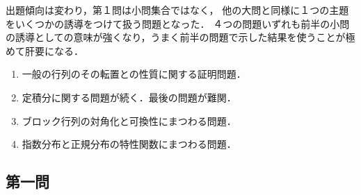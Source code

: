 \documentclass[uplatex,dvipdfmx]{jsarticle}
\begin{document}
\begin{tcolorbox}[colframe=ForestGreen, colback=ForestGreen!10!white,breakable,colbacktitle=ForestGreen!40!white,coltitle=black,fonttitle=\bfseries\sffamily,
    title=概観]
    出題傾向は変わり，第１問は小問集合ではなく，
    他の大問と同様に１つの主題をいくつかの誘導をつけて扱う問題となった．
    ４つの問題いずれも前半の小問の誘導としての意味が強くなり，うまく前半の問題で示した結果を使うことが極めて肝要になる．
    \begin{enumerate}[{第}1{問}]
        \item 一般の行列のその転置との性質に関する証明問題．
        \item 定積分に関する問題が続く．最後の問題が難関．
        \item ブロック行列の対角化と可換性にまつわる問題．
        \item 指数分布と正規分布の特性関数にまつわる問題．
    \end{enumerate}
\end{tcolorbox}

\subsection{第一問}
\end{document}
